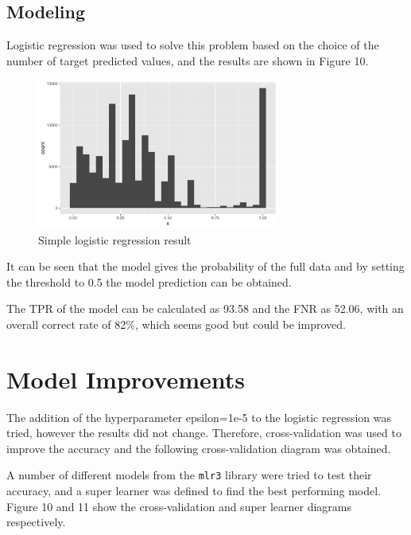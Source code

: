 \documentclass{article}
\begin{document}
\subsection{Modeling}

Logistic regression was used to solve this problem based on the choice of the number of target predicted values, and the results are shown in Figure 10.

\begin{figure}[h]
\centering
\includegraphics[width=8cm]{lrresult.png} %
\caption{Simple logistic regression result} %
\end{figure}

It can be seen that the model gives the probability of the full data and by setting the threshold to 0.5 the model prediction can be obtained.

The TPR of the model can be calculated as 93.58 and the FNR as 52.06, with an overall correct rate of 82\%, which seems good but could be improved.

\section{Model Improvements}

The addition of the hyperparameter epsilon=1e-5 to the logistic regression was tried, however the results did not change. Therefore, cross-validation was used to improve the accuracy and the following cross-validation diagram was obtained.

A number of different models from the \verb|mlr3| library were tried to test their accuracy, and a super learner was defined to find the best performing model. Figure 10 and 11 show the cross-validation and super learner diagrams respectively.
\end{document}
